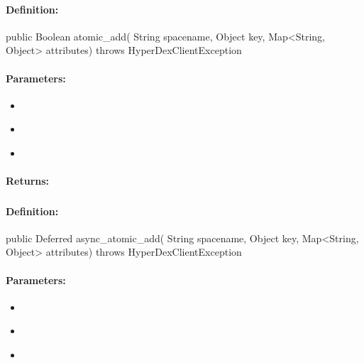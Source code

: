 \paragraph{Definition:}
\begin{javacode}
public Boolean atomic_add(
        String spacename,
        Object key,
        Map<String, Object> attributes) throws HyperDexClientException
\end{javacode}

\paragraph{Parameters:}
\begin{itemize}[noitemsep]
\item {}\\

\item {}\\

\item {}\\

\end{itemize}

\paragraph{Returns:}


\pagebreak
\subsubsection{}
\label{api:java:async_atomic_add}


\paragraph{Definition:}
\begin{javacode}
public Deferred async_atomic_add(
        String spacename,
        Object key,
        Map<String, Object> attributes) throws HyperDexClientException
\end{javacode}

\paragraph{Parameters:}
\begin{itemize}[noitemsep]
\item {}\\

\item {}\\

\item {}\\

\end{itemize}

